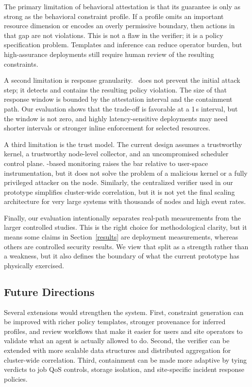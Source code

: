 The primary limitation of behavioral attestation is that its guarantee is only
as strong as the behavioral constraint profile. If a profile omits an important
resource dimension or encodes an overly permissive boundary, then actions in
that gap are not violations. This is not a flaw in the verifier; it is a policy
specification problem. Templates and inference can reduce operator burden, but
high-assurance deployments still require human review of the resulting
constraints.

A second limitation is response granularity. \projectname~does not prevent the initial
attack step; it detects and contains the resulting policy violation. The size of
that response window is bounded by the attestation interval and the containment
path. Our evaluation shows that the trade-off is favorable at a 1\,s interval,
but the window is not zero, and highly latency-sensitive deployments may need
shorter intervals or stronger inline enforcement for selected resources.

A third limitation is the trust model. The current design assumes a trustworthy
kernel, a trustworthy node-level collector, and an uncompromised scheduler
control plane. \ebpf-based monitoring raises the bar relative to user-space
instrumentation, but it does not solve the problem of a malicious kernel or a
fully privileged attacker on the node. Similarly, the centralized verifier used
in our prototype simplifies cluster-wide correlation, but it is not yet the
final scaling architecture for very large systems with thousands of nodes and
high event rates.

Finally, our evaluation intentionally separates real-path measurements from the
larger controlled studies. This is the right choice for methodological clarity,
but it means some claims in Section~\ref{results} are deployment measurements, whereas others
are controlled security results. We view that split as a strength rather than a
weakness, but it also defines the boundary of what the current prototype has
physically exercised.

\subsection{Future Directions}

Several extensions would strengthen the system. First, constraint generation can
be improved with richer policy templates, stronger provenance for inferred
profiles, and review workflows that make it easier for users and site operators
to validate what an agent is actually allowed to do. Second, the verifier can be
extended with more scalable data structures and distributed aggregation for
cluster-wide correlation. Third, containment can be made more adaptive by tying
verdicts to job QoS controls, storage isolation, and site-specific incident
response policies.

